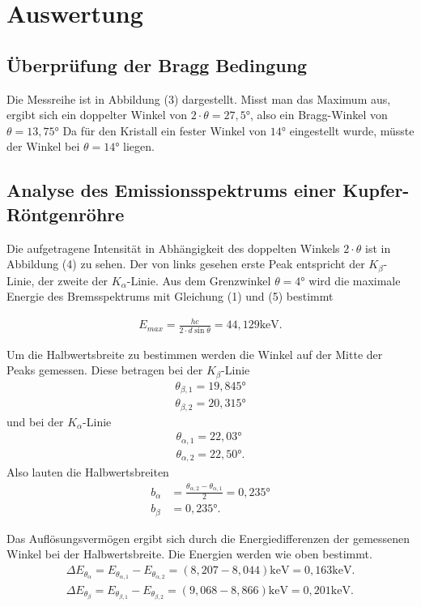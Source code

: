 \section{Auswertung}
\label{sec:Auswertung}

\subsection{Überprüfung der Bragg Bedingung}
Die Messreihe ist in Abbildung (3) dargestellt.
Misst man das Maximum aus, ergibt sich ein doppelter Winkel von $2 \cdot \theta = 27,5$°, also ein Bragg-Winkel von $\theta = 13,75$° Da für den Kristall ein fester Winkel von $14$° eingestellt wurde, müsste der Winkel bei $\theta = 14$° liegen.


\subsection{Analyse des Emissionsspektrums einer Kupfer-Röntgenröhre}
Die aufgetragene Intensität in Abhängigkeit des doppelten Winkels $2 \cdot \theta$ ist in Abbildung (4) zu sehen.
Der von links gesehen erste Peak entspricht der $K_{\beta}$-Linie, der zweite der $K_{\alpha}$-Linie.
Aus dem Grenzwinkel $\theta = 4$° wird die maximale Energie des Bremsspektrums mit Gleichung (1) und (5) bestimmt

\begin{align*}
E_{max} = \frac{hc}{2\cdot d \sin{\theta}} = 44,129 \si{\keV} .
\end{align*}

\noindent Um die Halbwertsbreite zu bestimmen werden die Winkel auf der Mitte der Peaks gemessen. 
Diese betragen bei der $K_{\beta}$-Linie
\begin{align*}
\theta_{\beta,1} = 19,845° \\
\theta_{\beta,2} = 20,315°
\end{align*}
und bei der $K_{\alpha}$-Linie
\begin{align*}
\theta_{\alpha,1} = 22,03° \\
\theta_{\alpha,2} = 22,50° .
\end{align*}
Also lauten die Halbwertsbreiten
\begin{align*}
b_{\alpha} &= \frac{\theta_{\alpha,2} - \theta_{\alpha,1}}{2} = 0,235° \\
b_{\beta} &= 0,235° .
\end{align*}

\noindent Das Auflösungsvermögen ergibt sich durch die Energiedifferenzen der gemessenen Winkel bei der Halbwertsbreite. Die Energien werden wie oben bestimmt.
\begin{align*}
\Delta E_{\theta_{\alpha}} = E_{\theta_{\alpha,1}} - E_{\theta_{\alpha,2}} = (8,207 - 8,044) \si{\keV} = 0,163 \si{\keV}. \\
\Delta E_{\theta_{\beta}} = E_{\theta_{\beta,1}} - E_{\theta_{\beta,2}} = (9,068 - 8,866) \si{\keV} = 0,201 \si{\keV}. 
\end{align*}


